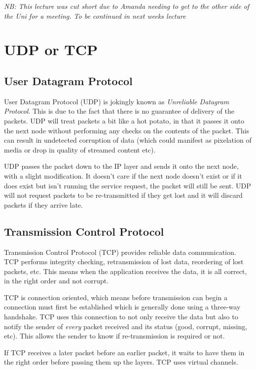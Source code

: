 
\textit{NB: This lecture was cut short due to Amanda needing to get to the other side of the Uni for a meeting. To be continued in next weeks lecture}


\section*{UDP or TCP}
\subsection*{User Datagram Protocol}
User Datagram Protocol (UDP) is jokingly known as \textit{Unreliable Datagram Protocol}. This is due to the fact that there is no guarantee of delivery of the packets. UDP will treat packets a bit like a hot potato, in that it passes it onto the next node without performing any checks on the contents of the packet. This can result in undetected corruption of data (which could manifest as pixelation of media or drop in quality of streamed content etc).

UDP passes the packet down to the IP layer and sends it onto the next node, with a slight modification. It doesn't care if the next node doesn't exist or if it does exist but isn't running the service request, the packet will still be sent. UDP will not request packets to be re-transmitted if they get lost and it will discard packets if they arrive late.

\subsection*{Transmission Control Protocol}
Transmission Control Protocol (TCP) provides reliable data communication. TCP performs integrity checking, retransmission of lost data, reordering of lost packets, etc. This means when the application receives the data, it is all correct, in the right order and not corrupt.

TCP is connection oriented, which means before transmission can begin a connection must first be established which is generally done using a three-way handshake. TCP uses this connection to not only receive the data but also to notify the sender of \textit{every} packet received and its status (good, corrupt, missing, etc). This allows the sender to know if re-transmission is required or not. 

If TCP receives a later packet before an earlier packet, it waits to have them in the right order before passing them up the layers. TCP uses virtual channels. 

